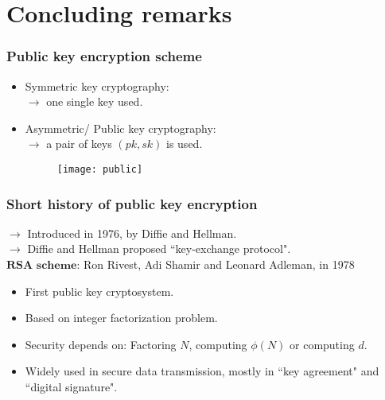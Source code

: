 \documentclass{beamer}
\begin{document}
\section{Concluding remarks}


\begin{frame}[t]
\frametitle{Public key encryption scheme}
\begin{itemize}

\item Symmetric key cryptography:\\
$\rightarrow$ one single key used.
\vspace*{2mm}
\item Asymmetric/ Public key cryptography:\\
$\rightarrow$ a pair of keys $(pk,sk)$ is used.

\begin{figure}[t]
\texttt{[image: public]}
\centering
\end{figure}

\end{itemize}
\end{frame}


\begin{frame}[t]
\frametitle{Short history of public key encryption}
$\rightarrow$ Introduced in 1976, by Diffie and Hellman.\\
$\rightarrow$ Diffie and Hellman proposed ``key-exchange protocol".\\
\vspace*{5mm}
$\textbf{RSA scheme:}$ Ron Rivest, Adi Shamir and Leonard Adleman, in 1978
\vspace*{3mm}
\begin{itemize}
\item  First public key cryptosystem.
\vspace*{2mm}
\item  Based on integer factorization problem.
\vspace*{2mm}
\item  Security depends on: Factoring $N$, computing $\phi(N)$ or computing $d$.
\vspace*{2mm}
\item  Widely used in secure data transmission, mostly in ``key agreement" and ``digital signature". 

\end{itemize}
\end{frame}
\end{document}
